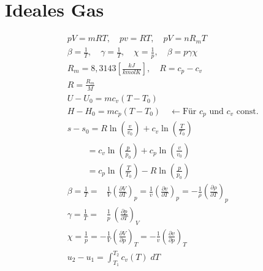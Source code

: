 \documentclass[twocolumn]{article}
\begin{document}
\section{Ideales Gas}
\begin{align*}
	&pV = mRT, \quad pv = RT, \quad pV = nR_mT \\
	&\beta = \frac{1}{T},\quad 
	\gamma = \frac{1}{T},\quad 
	\chi = \frac{1}{p}, \quad \beta = p \gamma \chi\\
	&R_m = 8,3143\left[\frac{kJ}{kmolK}\right], \quad 
	R = c_p - c_v\\
	&R = \frac{R_m}{M} \\
	&U - U_0 = mc_v(T-T_0) \\
	&H - H_0 = mc_p(T-T_0) \quad \leftarrow \text{Für $c_p$ und $c_v$ const.} \\
	&s - s_0 = R \ln \left(\frac{ v}{ v_0}\right)_{} + c_v \ln \left(\frac{ T}{ T_0}\right)_{} \\
	&\qquad \; 
	= c_v \ln \left( \frac{p}{p_0} \right) + c_p \ln \left( \frac{v}{v_0} \right) \\
	&\qquad \; 
	= c_p \ln \left( \frac{T}{T_0} \right) -R \ln \left( \frac{p}{p_0} \right) \\
	&\beta 
	= \frac{1}{T} 
	= \; \;\: \frac{1}{V}\left(\frac{\partial V}{\partial T}\right)_{p} 
	=  \frac{1}{v}\left(\frac{\partial v}{\partial T}\right)_{p} 
	=  - \frac{1}{\rho}\left(\frac{\partial \rho}{\partial T}\right)_{p}  \\
	&\gamma 
	= \frac{1}{T} 
	=  \; \;\; \frac{1}{p} \: \left(\frac{\partial p}{\partial T}\right)_{V} \\
	&\chi 
	= \frac{1}{p} 
	= - \frac{1}{V}\left(\frac{\partial V}{\partial p}\right)_{T}  
	= - \frac{1}{v}\left(\frac{\partial v}{\partial p}\right)_{T} \\
	& u_2 - u_1 = \int_{T_1}^{T_2} c_v(T)\; dT \\
\end{align*}
\end{document}
